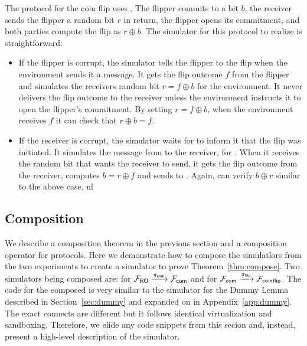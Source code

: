 
The protocol for the coin flip uses \Fcom. 
The flipper commits to a bit $b$, the receiver sends the flipper a random bit $r$ in return, the flipper opens its commitment, and both parties compute the flip as $r \oplus b$.
The simulator for this protocol to realize \Fflip is straightforward:
\begin{itemize}
\item If the flipper is corrupt, the simulator tells the flipper to  the flip when the environment sends it a  message. It gets the flip outcome $f$ from the flipper and simulates the receivers random bit $r = f \oplus b$ for the environment. It never delivers the flip outcome to the receiver unless the environment instructs it to open the flipper's commitment. By setting $r = f \oplus b$, when the environment receives $f$ it can check that $r \oplus b = f$.
\item If the receiver is corrupt, the simulator waits for \Fflip to inform it that the flip was initiated. It simulates the  message from \Fcom to the receiver, for \Z. When it receives the random bit that \Z wants the receiver to send, it gets the flip outcome from the receiver, computes $b = r \oplus f$ and sends  to \Z. Again, \Z can verify $b \oplus r$ similar to the above case.
nl
\end{itemize}

\subsection{Composition}
We describe a composition theorem in the previous section and a composition operator for protocols.
Here we demonstrate how to compose the simulatlors from the two experiments to create a simulator to prove Theorem~\ref{thm:compose}.
Two simulators being composed are:  for $\mathcal{F}_{{\mathsf {RO}}} \xrightarrow{\pi_{{\mathsf {com}}}} \mathcal{F}_{{\mathsf {com}}}$ and  for $\mathcal{F}_{{\mathsf {com}}} \xrightarrow{\pi_{{\mathsf {flip}}}} \mathcal{F}_{{\mathsf {coinflip}}}$. 
The code for the composed is very similar to the simulator for the Dummy Lemma described in Section~\ref{sec:dummy} and expanded on in Appendix~\ref{app:dummy}.
The exact connects are different but it follows identical virtualization and sandboxing.
Therefore, we elide any code snippets from this secion and, instead, present a high-level description of the simulator.

